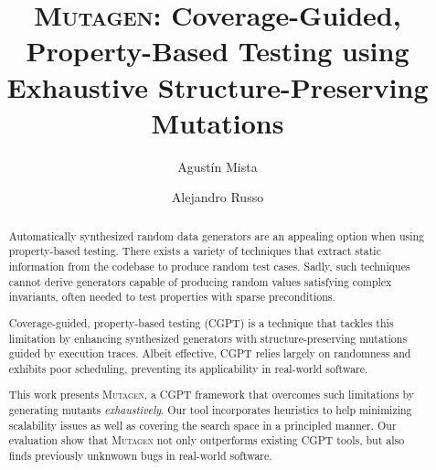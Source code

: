 \documentclass[sigconf,review,anonymous]{acmart}
\newcommand{\mutagen}{\textsc{Mutagen}\xspace}
\begin{document}
\title[\mutagen]{\mutagen: Coverage-Guided, Property-Based Testing using
  Exhaustive Structure-Preserving Mutations}



\author{Agust\'in Mista}

\author{Alejandro Russo}





\begin{abstract}
Automatically synthesized random data generators are an appealing option when
using property-based testing.
%
There exists a variety of techniques that extract static information from the
codebase to produce random test cases.
%
Sadly, such techniques cannot derive generators capable of producing random
values satisfying complex invariants, often needed to test properties with
sparse preconditions.


Coverage-guided, property-based testing (CGPT) is a technique that tackles this
limitation by enhancing synthesized generators with structure-preserving
mutations guided by execution traces.
%
Albeit effective, CGPT relies largely on randomness and exhibits poor
scheduling, preventing its applicability in real-world software.


This work presents \mutagen, a CGPT framework that overcomes such limitations by
generating mutants \emph{exhaustively}.
%
Our tool incorporates heuristics to help minimizing scalability issues as well
as covering the search space in a principled manner.   
%
%
Our evaluation show that \mutagen not only outperforms existing CGPT tools, but
also finds previously unknwown bugs in real-world software.
\end{abstract}
\end{document}
